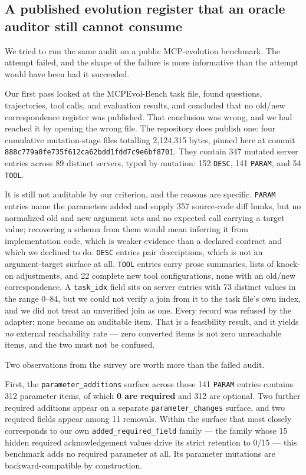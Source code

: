 \documentclass[11pt]{article}
\newcommand{\sha}[1]{\texttt{\scriptsize #1}}
\newcommand{\dfam}[1]{\texttt{#1}}
\begin{document}
\subsection{A published evolution register that an oracle auditor still cannot
consume}
\label{sec:pathA}

We tried to run the same audit on a public MCP-evolution benchmark. The attempt
failed, and the shape of the failure is more informative than the attempt would
have been had it succeeded.

Our first pass looked at the MCPEvol-Bench task file, found questions,
trajectories, tool calls, and evaluation results, and concluded that no
old/new correspondence register was published. That conclusion was wrong, and
we had reached it by opening the wrong file. The repository does publish one:
four cumulative mutation-stage files totalling 2,124,315 bytes, pinned here at
commit \sha{888c779a0fe735f612ca62bdd1fdd7c9e6bf8701}. They contain 347 mutated
server entries across 89 distinct servers, typed by mutation: 152
\texttt{DESC}, 141 \texttt{PARAM}, and 54 \texttt{TOOL}.

It is still not auditable by our criterion, and the reasons are specific.
\texttt{PARAM} entries name the parameters added and supply 357 source-code
diff hunks, but no normalized old and new argument sets and no expected call
carrying a target value; recovering a schema from them would mean inferring it
from implementation code, which is weaker evidence than a declared contract and
which we declined to do. \texttt{DESC} entries pair descriptions, which is not
an argument-target surface at all. \texttt{TOOL} entries carry prose summaries,
lists of knock-on adjustments, and 22 complete new tool configurations, none
with an old/new correspondence. A \texttt{task\_idx} field sits on server
entries with 73 distinct values in the range 0--84, but we could not verify a
join from it to the task file's own index, and we did not treat an unverified
join as one. Every record was refused by the adapter; none became an auditable
item. That is a feasibility result, and it yields \emph{no} external
reachability rate --- zero converted items is not zero unreachable items, and
the two must not be confused.

Two observations from the survey are worth more than the failed audit.

First, the \texttt{parameter\_additions} surface across those 141
\texttt{PARAM} entries contains 312 parameter items, of which \textbf{0 are
required} and 312 are optional. Two further required additions appear on a
separate \texttt{parameter\_changes} surface, and two required fields appear
among 11 removals. Within the surface that most closely corresponds to our own
\dfam{added\_required\_field} family --- the family whose 15 hidden required
acknowledgement values drive its strict retention to 0/15 --- this benchmark
adds no required parameter at all. Its parameter mutations are
backward-compatible by construction.
\end{document}
